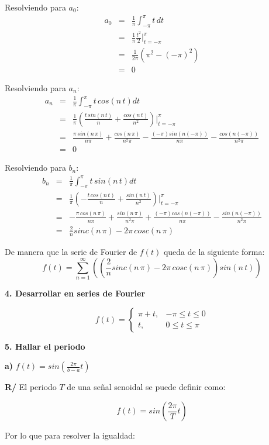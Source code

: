 \documentclass[twocolumn]{article}
\begin{document}
Resolviendo para $a_0$:
\begin{eqnarray*}
a_0 &=& \frac{1}{\pi}\int_{-\pi}^{\pi}t\,dt\\
&=& \frac{1}{\pi} \frac{t^2}{2}\bigg|_{t=-\pi}^{\pi}\\
&=& \frac{1}{2\pi} (\pi^2 - (-\pi)^2)\\
&=& 0
\end{eqnarray*}

Resolviendo para $a_n$:
\begin{eqnarray*}
a_n &=& \frac{1}{\pi}\int_{-\pi}^{\pi}t\,cos(n\,t)dt\\
&=& \frac{1}{\pi} \left(\frac{t\,sin(n\,t)}{n} + \frac{cos(n\,t)}{n^2}\right)\bigg|_{t=-\pi}^{\pi}\\
&=& \frac{\pi\,sin(n\,\pi)}{n\pi} + \frac{cos(n\,\pi)}{n^2\pi} - \frac{(-\pi)sin(n(-\pi))}{n\pi} - \frac{cos(n(-\pi))}{n^2\pi}\\
&=& 0
\end{eqnarray*}

Resolviendo para $b_n$:
\begin{eqnarray*}
b_n &=& \frac{1}{\pi}\int_{-\pi}^{\pi}t\,sin(n\,t)dt\\
&=& \frac{1}{\pi} \left(-\frac{t\,cos(n\,t)}{n} + \frac{sin(n\,t)}{n^2}\right)\bigg|_{t=-\pi}^{\pi}\\
&=& -\frac{\pi\,cos(n\,\pi)}{n\pi} + \frac{sin(n\,\pi)}{n^2\pi} + \frac{(-\pi)cos(n(-\pi))}{n\pi} - \frac{sin(n(-\pi))}{n^2\pi}\\
&=& \frac{2}{n}sinc(n\,\pi) -2\pi\,cosc(n\,\pi)
\end{eqnarray*}

De manera que la serie de Fourier de $f(t)$ queda de la siguiente forma:
$$f(t) = \sum_{n=1}^\infty\left(\left(\frac{2}{n}sinc(n\,\pi) -2\pi\,cosc(n\,\pi)\right)sin(n\,t)\right)$$

\textbf{4. Desarrollar en series de Fourier}

$$f(t) = \begin{cases}
\pi +t, &-\pi \leq t \leq 0\\
t, &0 \leq t \leq \pi
\end{cases}$$

\textbf{5. Hallar el periodo}

\textbf{a)} $f(t) = sin(\frac{2\pi}{b-a}t)$

\textbf{R/} El periodo $T$ de una señal senoidal se puede definir como:

$$f(t) = sin\left(\frac{2\pi}{T}t\right)$$

Por lo que para resolver la igualdad:
\end{document}
